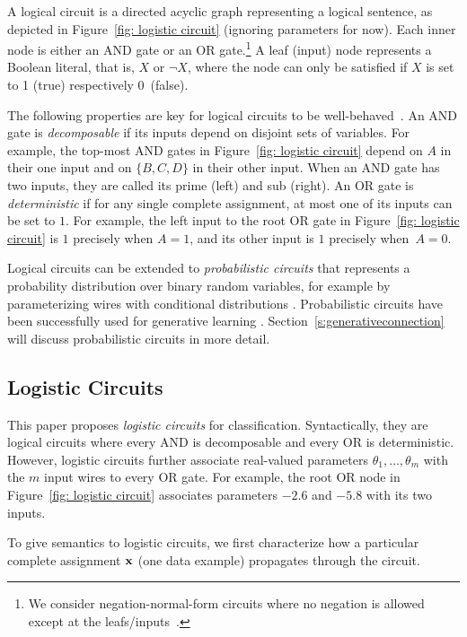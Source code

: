 \documentclass[letterpaper]{article} %
\begin{document}
A logical circuit is a directed acyclic graph  representing a logical sentence, as depicted in Figure~\ref{fig: logistic circuit} (ignoring parameters for now). 
Each inner node is either an AND gate or an OR gate.\footnote{We consider negation-normal-form circuits where no negation is allowed except at the leafs/inputs~\cite{darwicheJAIR02}.} 
A leaf (input) node represents a Boolean literal, that is, $X$ or $\neg X$, where the node can only be satisfied if $X$ is set to 1 (true) respectively 0~(false).

The following properties are key for logical circuits to be well-behaved~\cite{darwicheJAIR02}.
An AND gate is \emph{decomposable} if its inputs depend on disjoint sets of variables.  
For example, the top-most AND gates in Figure~\ref{fig: logistic circuit} depend on $A$ in their one input and on $\{B,C,D\}$ in their other input. 
When an AND gate has two inputs, they are called its prime (left) and sub (right).
An OR gate is \emph{deterministic} if for any single complete assignment, at most one of its inputs can be set to $1$. For example, the left input to the root OR gate  in Figure~\ref{fig: logistic circuit} is $1$ precisely when $A=1$, and its other input is $1$ precisely when~$A=0$.


Logical circuits can be extended to \textit{probabilistic circuits} that represents a probability distribution over binary random variables, for example by parameterizing wires with conditional distributions \cite{KisaVCD14}.
Probabilistic circuits have been successfully used for generative learning \cite{Liang2017}. Section~\ref{s:generativeconnection} will discuss probabilistic circuits in more detail.

\subsection{Logistic Circuits}
\label{s: logistic circuits}
This paper proposes \emph{logistic circuits} for classification. Syntactically, they are logical circuits where every AND is decomposable and every OR is deterministic. 
However, logistic circuits further associate real-valued parameters $\theta_1, \dots, \theta_m$ with the $m$ input wires to every OR gate. For example, the root OR node in Figure~\ref{fig: logistic circuit} associates parameters $-2.6$ and $-5.8$ with its two inputs.

To give semantics to logistic circuits, we first characterize how a particular complete assignment $\bf x$ (one data example) propagates through the circuit.
\end{document}
